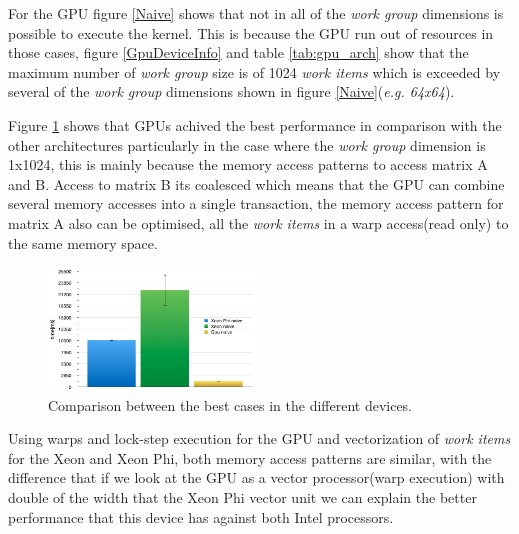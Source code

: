 \par{For the GPU figure \ref{Naive} shows that not in all of the 
    \emph{work group} dimensions is possible to execute the kernel. 
    This is because the GPU run out of resources in those cases\cite{opencl_error},
    figure \ref{GpuDeviceInfo} and table \ref{tab:gpu_arch} show that the 
    maximum number of \emph{work group} size is of 1024 \emph{work items} which
    is exceeded by several of the \emph{work group} dimensions shown in figure 
    \ref{Naive}(\emph{e.g. 64x64}).}

\par{Figure \ref{NaiveRes} shows that GPUs achived the best performance in 
    comparison with the other architectures particularly
    in the case where the \emph{work group} dimension is 1x1024,
    this is mainly because the memory access patterns to access matrix A and B. 
    Access to matrix B its coalesced which means that the GPU can combine several 
    memory accesses into a single transaction, the memory access pattern for matrix 
    A also can be optimised, all the \emph{work items} in a warp access(read only)
    to the same memory space}.

\begin{figure}[!h]
    \centering
    \includegraphics[width=0.49\textwidth]{figures/naiveRes.png}
    \caption{Comparison between the best cases in the different devices.}
    \label{NaiveRes}
\end{figure}

\par{Using warps and lock-step execution for the 
    GPU and vectorization of \emph{work items} for the Xeon and Xeon Phi, both
    memory access patterns are similar, with the difference that if we look at
    the GPU as a vector processor(warp execution) with double of the width that the
    Xeon Phi vector unit we can explain the better performance that this device 
    has against both Intel processors.}



